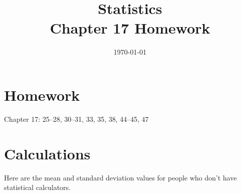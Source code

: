 \documentclass[letterpaper]{exam}
\title{Statistics \\ Chapter 17 Homework}
\date{\today}
\author{}
\begin{document}
  \maketitle

  \section{Homework}
  Chapter 17: 25--28, 30--31, 33, 35, 38, 44--45, 47

  \ifprintanswers{}
  \else
  \section{Calculations}

  Here are the mean and standard deviation values for people who don't have
  statistical calculators.
\end{document}
